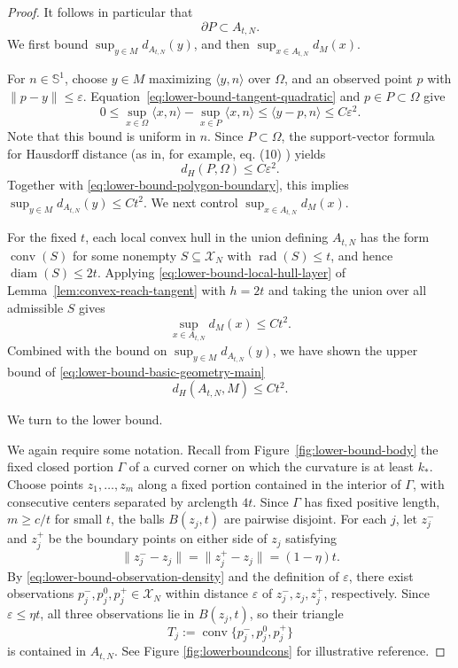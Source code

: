 \documentclass{article}
\newcommand{\diam}{\operatorname{diam}}
\numberwithin{equation}{section}
\newcommand{\eps}{\varepsilon}
\renewcommand{\epsilon}{\eps}
\begin{document}
\begin{proof}
It follows in particular that
\begin{equation}
 \partial P\subset A_{t,N}.
\label{eq:lower-bound-polygon-boundary}
\end{equation}
We first bound $\sup_{y\in M}d_{A_{t,N}}(y)$, and then
$\sup_{x\in A_{t,N}}d_M(x)$.

For $n\in\mathbb S^1$, choose $y\in M$ maximizing
$\langle y,n\rangle$ over $\Omega$, and an observed point $p$ with
$\|p-y\|\le\epsilon$. Equation~\eqref{eq:lower-bound-tangent-quadratic}
and $p\in P\subset\Omega$ give
\[
 0\le
 \sup_{x\in\Omega}\langle x,n\rangle
 -\sup_{x\in P}\langle x,n\rangle
 \le \langle y-p,n\rangle
 \le C\epsilon^2.
\]
Note that this bound is uniform in $n$. Since $P\subset\Omega$, the support-vector formula for Hausdorff distance
(as in, for example, eq. (10) \cite{liu2023asymptotic}) yields
\begin{equation}
 d_H(P,\Omega)\le C\epsilon^2.
\label{eq:lower-bound-convex-hulls}
\end{equation}
Together with \eqref{eq:lower-bound-polygon-boundary}, this implies
$\sup_{y\in M}d_{A_{t,N}}(y)\le Ct^2$. We next control
$\sup_{x\in A_{t,N}}d_M(x)$.

For the fixed $t$, each local convex hull in the union defining
$A_{t,N}$ has the form
$\operatorname{conv}(S)$ for some nonempty $S\subseteq\mathcal X_N$ with
$\operatorname{rad}(S)\le t$, and hence $\diam(S)\le2t$. Applying
\eqref{eq:lower-bound-local-hull-layer} of
Lemma~\ref{lem:convex-reach-tangent} with $h=2t$ and taking the union over
all admissible $S$ gives
\[
 \sup_{x\in A_{t,N}}d_M(x)\le Ct^2.
\]
Combined with the bound on $\sup_{y\in M}d_{A_{t,N}}(y)$, we have shown the upper bound of \eqref{eq:lower-bound-basic-geometry-main}
\[
 d_H(A_{t,N},M)\le Ct^2.
\]

We turn to the lower bound. 

We again require some notation. Recall from
Figure~\ref{fig:lower-bound-body} the fixed closed portion $\Gamma$ of a
curved corner on which the curvature is at least $k_*$. Choose points
$z_1,\ldots,z_m$ along a fixed portion contained in the interior of
$\Gamma$, with
consecutive centers separated by arclength $4t$.
Since $\Gamma$ has fixed positive length, $m\ge c/t$ for small $t$, the
balls $B(z_j,t)$ are pairwise disjoint. For each $j$, let $z_j^-$ and
$z_j^+$ be the boundary points on either side of $z_j$ satisfying
\[
 \|z_j^--z_j\|=\|z_j^+-z_j\|=(1-\eta)t.
\]
By \eqref{eq:lower-bound-observation-density} and the definition of
$\epsilon$, there exist observations
$p_j^-,p_j^0,p_j^+\in\mathcal X_N$ within distance $\epsilon$ of
$z_j^-,z_j,z_j^+$, respectively. Since $\epsilon\le\eta t$, all three
observations lie in $B(z_j,t)$, so their triangle
\[
 T_j:=\operatorname{conv}\{p_j^-,p_j^0,p_j^+\}
\]
is contained in $A_{t,N}$. See Figure \ref{fig:lowerboundcons} for illustrative reference.


\end{proof}
\end{document}
